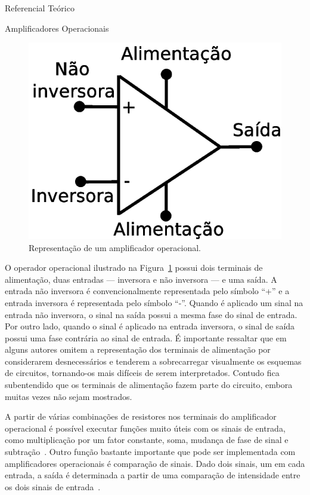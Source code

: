 \begin{chapter}{Referencial Teórico}
\begin{section}{Amplificadores Operacionais}
\begin{figure}[!h]
	\centering
	\begin{minipage}[c]{\textwidth}
	\centering
	\includegraphics[width=0.5\linewidth]{fig/opamp}
	\caption{Representação de um amplificador operacional.}
	\label{fig:opamp}
	\end{minipage}
\end{figure}

O operador operacional ilustrado na Figura~\ref{fig:opamp} possui dois terminais
de alimentação, duas entradas --- inversora e não inversora --- e uma saída. A
entrada não inversora é convencionalmente representada pelo símbolo ``+'' e a 
entrada inversora é representada pelo símbolo ``-''. Quando é aplicado um sinal
na entrada não inversora, o sinal na saída possui a mesma fase do sinal de
entrada. Por outro lado, quando o sinal é aplicado na entrada inversora, o sinal
de saída possui uma fase contrária ao sinal de entrada. É importante ressaltar
que em alguns autores omitem a representação dos terminais de alimentação por
considerarem desnecessários e tenderem a sobrecarregar visualmente os esquemas
de circuitos, tornando-os mais difíceis de serem interpretados. Contudo fica
subentendido que os terminais de alimentação fazem parte do circuito, embora
muitas vezes não sejam mostrados.

A partir de várias combinações de resistores nos terminais do amplificador
operacional é possível executar funções muito úteis com os sinais de entrada, 
como multiplicação por um fator constante, soma, mudança de fase de sinal e
subtração~\cite{Nilson09}. Outro função bastante importante que pode ser
implementada com amplificadores operacionais é comparação de sinais. Dado dois
sinais, um em cada entrada, a saída é determinada a partir de uma comparação de
intensidade entre os dois sinais de entrada~\cite{Terrell96}.  
 


\end{section}
\end{chapter}
